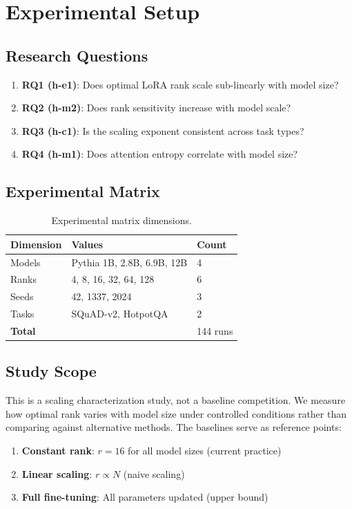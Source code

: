 \section{Experimental Setup}

\subsection{Research Questions}

\begin{enumerate}
    \item \textbf{RQ1 (h-e1)}: Does optimal LoRA rank scale sub-linearly with model size?
    \item \textbf{RQ2 (h-m2)}: Does rank sensitivity increase with model scale?
    \item \textbf{RQ3 (h-c1)}: Is the scaling exponent consistent across task types?
    \item \textbf{RQ4 (h-m1)}: Does attention entropy correlate with model size?
\end{enumerate}

\subsection{Experimental Matrix}

\begin{table}[h]
\centering
\begin{tabular}{lll}
\toprule
\textbf{Dimension} & \textbf{Values} & \textbf{Count} \\
\midrule
Models & Pythia 1B, 2.8B, 6.9B, 12B & 4 \\
Ranks & 4, 8, 16, 32, 64, 128 & 6 \\
Seeds & 42, 1337, 2024 & 3 \\
Tasks & SQuAD-v2, HotpotQA & 2 \\
\midrule
\textbf{Total} & & 144 runs \\
\bottomrule
\end{tabular}
\caption{Experimental matrix dimensions.}
\label{tab:experimental_matrix}
\end{table}

\subsection{Study Scope}

This is a scaling characterization study, not a baseline competition. We measure how optimal rank varies with model size under controlled conditions rather than comparing against alternative methods. The baselines serve as reference points:

\begin{enumerate}
    \item \textbf{Constant rank}: $r=16$ for all model sizes (current practice)
    \item \textbf{Linear scaling}: $r \propto N$ (naive scaling)
    \item \textbf{Full fine-tuning}: All parameters updated (upper bound)
\end{enumerate}
